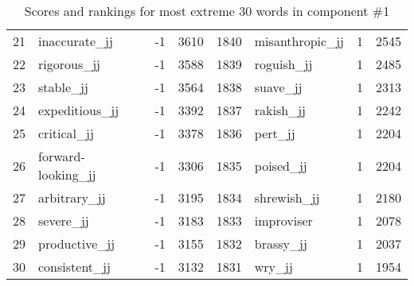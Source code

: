 \begin{table}[tbp]
\begin{tabular}{| rlr@{.}l | rlr@{.}l |}
    21 & inaccurate\_jj & -1 & 3610    &    1840 & misanthropic\_jj & 1 & 2545 \\
    22 & rigorous\_jj & -1 & 3588    &    1839 & roguish\_jj & 1 & 2485 \\
    23 & stable\_jj & -1 & 3564    &    1838 & suave\_jj & 1 & 2313 \\
    24 & expeditious\_jj & -1 & 3392    &    1837 & rakish\_jj & 1 & 2242 \\
    25 & critical\_jj & -1 & 3378    &    1836 & pert\_jj & 1 & 2204 \\
    26 & forward-looking\_jj & -1 & 3306    &    1835 & poised\_jj & 1 & 2204 \\
    27 & arbitrary\_jj & -1 & 3195    &    1834 & shrewish\_jj & 1 & 2180 \\
    28 & severe\_jj & -1 & 3183    &    1833 & improviser & 1 & 2078 \\
    29 & productive\_jj & -1 & 3155    &    1832 & brassy\_jj & 1 & 2037 \\
    30 & consistent\_jj & -1 & 3132    &    1831 & wry\_jj & 1 & 1954 \\
    \hline
    \end{tabular}
    \caption{Scores and rankings for most extreme 30 words in component \#1} 
\end{table}
\clearpage
